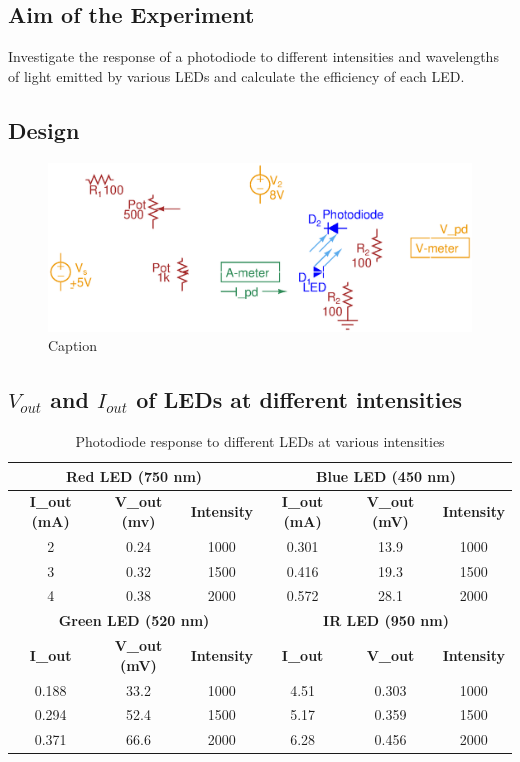 \documentclass[a4paper]{article}
\begin{document}
\subsection{Aim of the Experiment}
Investigate the response of a photodiode to different intensities and wavelengths of light emitted by various LEDs and calculate the efficiency of each LED.

\subsection{Design}
\begin{figure}[h!]
    \centering
    \includegraphics[scale=0.8]{Lab_3_Circuit_Design_Exp_2.eps}
    \caption{Caption}
    \label{fig:enter-label}
\end{figure}

\subsection{$V_{out}$ and $I_{out}$ of LEDs at different intensities}

\begin{table}[h!]
\centering
\begin{tabular}{|c|c|c|c|c|c|}
\hline
\multicolumn{3}{|c|}{\textbf{Red LED (750 nm)}} & \multicolumn{3}{c|}{\textbf{Blue LED (450 nm)}} \\ \hline
\textbf{I\_out (mA)} & \textbf{V\_out (mv)} & \textbf{Intensity} & \textbf{I\_out (mA)} & \textbf{V\_out (mV)} & \textbf{Intensity} \\ \hline
2 & 0.24 & 1000 & 0.301 & 13.9 & 1000 \\ \hline
3 & 0.32 & 1500 & 0.416 & 19.3 & 1500 \\ \hline
4 & 0.38 & 2000 & 0.572 & 28.1 & 2000 \\ \hline
\multicolumn{3}{|c|}{\textbf{Green LED (520 nm)}} & \multicolumn{3}{c|}{\textbf{IR LED (950 nm)}} \\ \hline
\textbf{I\_out} & \textbf{V\_out (mV)} & \textbf{Intensity} & \textbf{I\_out} & \textbf{V\_out} & \textbf{Intensity} \\ \hline
0.188 & 33.2 & 1000 & 4.51 & 0.303 & 1000 \\ \hline
0.294 & 52.4 & 1500 & 5.17 & 0.359 & 1500 \\ \hline
0.371 & 66.6 & 2000 & 6.28 & 0.456 & 2000 \\ \hline
\end{tabular}
\caption{Photodiode response to different LEDs at various intensities}
\label{tab:led_response}
\end{table}
\end{document}
